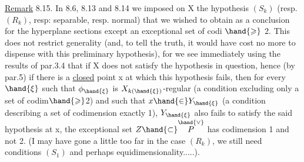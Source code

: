 \uline{Remark} 8.15. In 8.6, 8.13 and 8.14 we imposed on X
the hypothesis $(S_k)$ (resp. $(R_k)$, resp: separable, resp.  normal) that
we wished to obtain as a conclusion for the hyperplane sections
except  an exceptional set of codi $\hand{\geqslant}$ 2. This does not restrict
generality (and, to tell the truth, it would have cost no more
to dispense with this preliminary hypothesis), for we see immediately
using the results of par.3.4  that if X does not satisfy
the hypothesis in question, hence (by par.5) if there is a \uline{closed}
point x at which this hypothesis fails, then for every $\hand{\xi}$ such
that $\phi_{\hand{\xi}}$ is $X_{k(\hand{\xi})}$-regular (a condition excluding only a set of codim$\hand{\geqslant}$2)
and such that $x \hand{\in} Y_{\hand{\xi}}$ (a condition describing a set of codimension exactly
1), $Y_{\hand{\xi}}$ also fails to satisfy the said hypothesis at x,
 the exceptional set $Z \hand{\subset} \overset{\hand{\vee}}{P}$ has codimension 1 and not 2.
(I may have gone a little too far in the case $(R_k)$,  we still need
conditions $(S_1)$ and perhaps equidimensionality.....).

